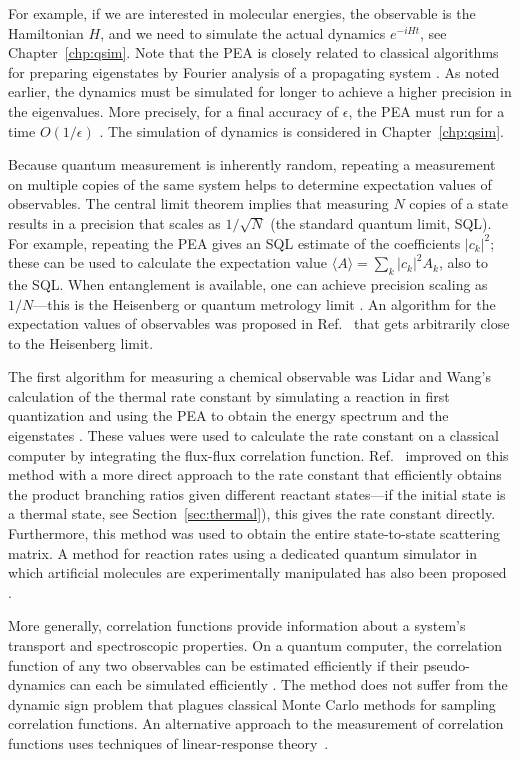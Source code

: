 \documentclass[11pt,oneside,final]{huthesis}%
\begin{document}
For example, if we are interested
in molecular energies, the observable is the Hamiltonian $H$, and we need to
simulate the actual dynamics $e^{-iHt}$, see Chapter~\ref{chp:qsim}. Note that the
PEA is closely related to classical algorithms for preparing eigenstates by
Fourier analysis of a propagating system \cite{Heller81,Tannor06}. As noted earlier, the dynamics must be simulated for
longer to achieve a higher precision in the eigenvalues. More precisely, for
a final accuracy of $\epsilon$, the PEA must run for a time $O(1/\epsilon)$
\cite{Nielsen00,Brown06}. The simulation of dynamics is considered in Chapter~\ref{chp:qsim}.

Because quantum measurement is inherently random, repeating a measurement on
multiple copies of the same system helps to determine expectation values of
observables. The central limit theorem implies that measuring $N$ copies of a
state results in a precision that scales as $1/\sqrt{N}$ (the standard quantum
limit, SQL). For example, repeating the PEA gives an SQL estimate of the
coefficients $|c_k|^2$; these can be used to calculate the expectation value
$\langle A\rangle=\sum_k |c_k|^2 A_k$, also to the SQL. When entanglement is
available, one can achieve precision scaling as $1/N$---this is the Heisenberg
or quantum metrology limit \cite{Giovannetti04}. An algorithm for the
expectation values of observables was proposed in Ref.~\cite{Knill07} that gets arbitrarily
close to the Heisenberg limit.

The first algorithm for measuring a chemical observable was Lidar and Wang's
calculation of the thermal rate constant by simulating a reaction in first
quantization and using the PEA to obtain the energy spectrum and the eigenstates
\cite{Lidar99}. These values were used to calculate the rate constant on a
classical computer by integrating the flux-flux correlation function. Ref.~\cite{Kassal08}
improved on this method with a more direct approach to the rate constant
 that efficiently obtains the product branching
ratios given different reactant states---if the initial state is a thermal state, see Section~\ref{sec:thermal}), this gives the rate constant directly.
Furthermore, this method was used to obtain the entire state-to-state scattering
matrix. A method for reaction rates using a dedicated quantum simulator in which artificial
molecules are experimentally manipulated has also been proposed
\cite{Smirnov07}.

More generally, correlation functions provide information about a system's
transport and spectroscopic properties. On a quantum computer, the correlation
function of any two observables can be estimated efficiently if their
pseudo-dynamics can each be simulated efficiently  \cite{Ortiz01,Somma03}.
The method does not suffer from the dynamic sign problem that plagues classical
Monte Carlo methods for sampling correlation functions.
An alternative approach to the measurement of correlation functions uses
techniques of linear-response theory~\cite{Terhal00}.
\end{document}
